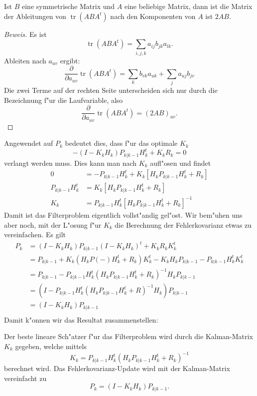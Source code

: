 \begin{hilfssatz}Ist $B$ eine symmetrische Matrix und $A$ eine beliebige
Matrix, dann ist die Matrix der Ableitungen von $\operatorname{tr}(ABA^t)$
nach den Komponenten von $A$  ist $2AB$.
\end{hilfssatz}

\begin{proof}[Beweis]
Es ist
\[
\operatorname{tr}(ABA^t)=\sum_{i,j,k}a_{ij}b_{jk}a_{lk}.
\]
Ableiten nach $a_{uv}$ ergibt:
\[
\frac{\partial}{\partial a_{uv}}\operatorname{tr}(ABA^t)
=\sum_{k}b_{vk}a_{uk}+\sum_{j}a_{uj}b_{jv}
\]
Die zwei Terme auf der rechten Seite unterscheiden sich nur durch
die Bezeichnung f"ur die Laufvariable, also
\[
\frac{\partial}{\partial a_{uv}}\operatorname{tr}(ABA^t)
=(2AB)_{uv}.
\]
\end{proof}

Angewendet auf $P_{k}$ bedeutet dies, dass f"ur das optimale $K_k$
\[
-(I-K_kH_{k})P_{k|k-1}H_{k}^t +K_kR_k=0
\]
verlangt werden muss.
Dies kann man nach $K_k$ aufl"osen und findet
\begin{align*}
0&=-P_{k|k-1}H_{k}^t +K_k[H_{k}P_{k|k-1}H_{k}^t +R_{k}]\\
P_{k|k-1}H_{k}^t&=K_k[H_{k}P_{k|k-1}H_{k}^t +R_{k}]\\
K_k&= P_{k|k-1}H_{k}^t [H_{k}P_{k|k-1}H_{k}^t +R_{k}]^{-1}
\end{align*}
Damit ist das Filterproblem eigentlich vollst"andig gel"ost.
Wir bem"uhen uns
aber noch, mit der L"osung f"ur $K_k$ die Berechnung der Fehlerkovarianz etwas zu
vereinfachen.
Es gilt
\begin{align*}
P_{k}&=(I-K_{k}H_{k})P_{k|k-1}(I-K_{k}H_{k})^t+K_{k}R_kK_{k}^t\\
&=P_{k|k-1} + K_{k}(H_{k}P(-)H_{k}^t+R_k)K_{k}^t -K_{k}H_{k}P_{k|k-1}-P_{k|k-1}H_{k}^tK_{k}^t\\
&=P_{k|k-1} - P_{k|k-1}H_{k}^t(H_{k}P_{k|k-1}H_{k}^t+R_k)^{-1}H_{k}P_{k|k-1}\\
&=(I-P_{k|k-1}H_{k}^t(H_{k}P_{k|k-1}H_{k}^t + R)^{-1}H_{k})P_{k|k-1}\\
&=(I-K_{k}H_{k})P_{k|k-1}\\
\end{align*}
Damit k"onnen wir das Resultat zusammenstellen:
\begin{satz}
Der beste lineare Sch"atzer f"ur das Filterproblem wird durch die Kalman-Matrix
$K_k$ gegeben, welche mittels
\begin{equation}
K_k=P_{k|k-1}H_k^t(H_kP_{k|k-1}H_k^t+R_k)^{-1}
\label{kalman-gains}
\end{equation}
berechnet wird.
Das Fehlerkovarianz-Update wird mit der Kalman-Matrix
vereinfacht zu
\[
P_k=(I-K_kH_k)P_{k|k-1}.
\]
\end{satz}

